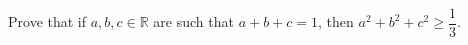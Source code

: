 Prove that if $a, b, c \in \mathbb{R}$
are such that $a + b + c = 1$,
then $a^2 + b^2 + c^2 \geq \dfrac{1}{3}$.
